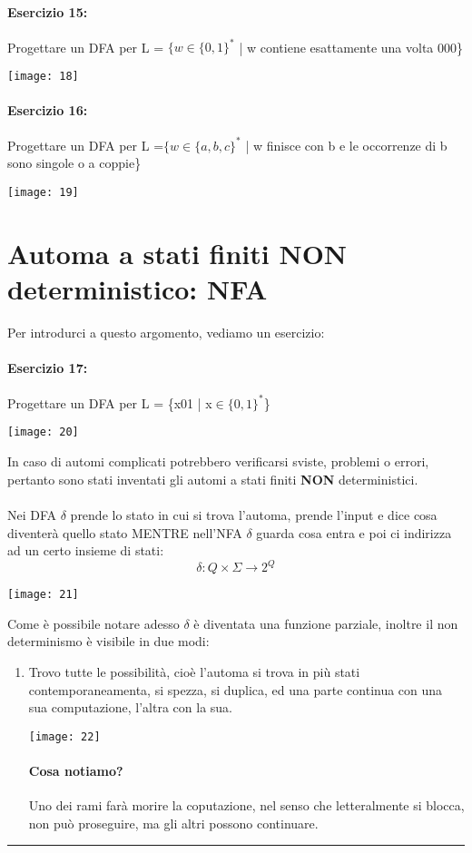 \documentclass[12pt, a4paper, openany, oneside]{book}
\begin{document}
\paragraph{Esercizio 15: }
Progettare un DFA per L = $\{w \in \{0,1\}^{*}$ | w contiene esattamente una volta
000\}
\begin{center}
\texttt{[image: 18]}
\end{center}
\paragraph{Esercizio 16: }
Progettare un DFA per L =$ \{w \in \{a,b,c\}^{*}$ | w finisce con b e le occorrenze
di b sono singole o a coppie\}
\begin{center}
\texttt{[image: 19]}
\end{center}
\section{Automa a stati finiti NON deterministico: NFA}
Per introdurci a questo argomento, vediamo un esercizio:
\paragraph{Esercizio 17: }
Progettare un DFA per L = \{x01 | x$\in\{0,1\}^{*}$\}
\begin{center}
\texttt{[image: 20]}
\end{center}
In caso di automi complicati potrebbero verificarsi sviste, problemi o errori, 
pertanto sono stati inventati gli automi a stati finiti \textbf{NON} deterministici.
\\ \\
Nei DFA $\delta$ prende lo stato in cui si trova l'automa, prende l'input e dice
cosa diventerà quello stato MENTRE nell'NFA $\delta$ guarda cosa entra e poi 
ci indirizza ad un certo insieme di stati:
\[
\delta : Q \times \Sigma \to 2^{Q}
\]
\begin{center}
\texttt{[image: 21]}
\end{center}
Come è possibile notare adesso $\delta$ è diventata una funzione parziale, inoltre
il non determinismo è visibile in due modi:
\begin{enumerate}
	\item Trovo tutte le possibilità, cioè l'automa si trova in più stati 
	contemporaneamenta, si spezza, si duplica, ed una parte continua con una
	sua computazione, l'altra con la sua. 
	\begin{center}
	\texttt{[image: 22]}
	\end{center}
	\paragraph{Cosa notiamo? }Uno dei rami farà morire la coputazione, nel senso
	che letteralmente si blocca, non può proseguire, ma gli altri possono continuare.
\end{enumerate}
{\color{black} \rule{\linewidth}{0.3mm}}
\end{document}
